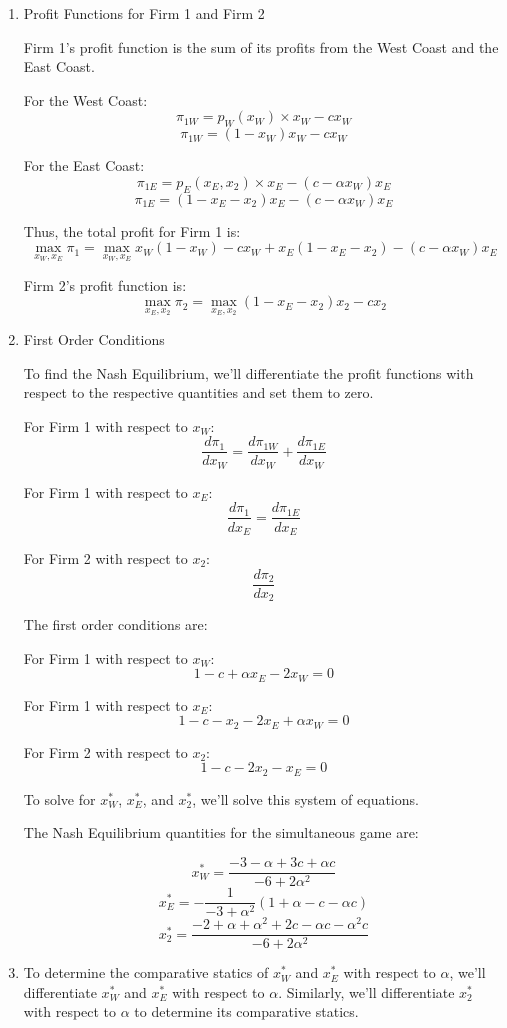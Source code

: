 \documentclass[UTF8,titlepage]{article}
\numberwithin{figure}{section}
\begin{document}
\begin{enumerate}
\item Profit Functions for Firm 1 and Firm 2

Firm 1's profit function is the sum of its profits from the West Coast and the East Coast. 

For the West Coast:
\[ \pi_{1W} = p_W(x_W) \times x_W - c x_W \]
\[ \pi_{1W} = (1-x_W) x_W - c x_W \]

For the East Coast:
\[ \pi_{1E} = p_E(x_E, x_2) \times x_E - (c-\alpha x_W) x_E \]
\[ \pi_{1E} = (1-x_E-x_2) x_E - (c-\alpha x_W) x_E \]

Thus, the total profit for Firm 1 is:
\[ \max _{x_{W}, x_{E}}\pi_1=\max _{x_{W}, x_{E}} x_{W}\left(1-x_{W}\right)-c x_{W}+x_{E}\left(1-x_{E}-x_{2}\right)-\left(c-\alpha x_{W}\right) x_{E} \]

Firm 2's profit function is:
\[ \max_{x_E,x_2}\pi_2 = \max_{x_E,x_2}(1-x_E-x_2) x_2 - c x_2 \]

\item First Order Conditions

To find the Nash Equilibrium, we'll differentiate the profit functions with respect to the respective quantities and set them to zero.

For Firm 1 with respect to \(x_W\):
\[ \frac{d\pi_1}{dx_W} = \frac{d\pi_{1W}}{dx_W} + \frac{d\pi_{1E}}{dx_W} \]

For Firm 1 with respect to \(x_E\):
\[ \frac{d\pi_1}{dx_E} = \frac{d\pi_{1E}}{dx_E} \]

For Firm 2 with respect to \(x_2\):
\[ \frac{d\pi_2}{dx_2} \]

The first order conditions are:

For Firm 1 with respect to \(x_W\):
\[ 1 - c + \alpha x_E - 2 x_W = 0 \]

For Firm 1 with respect to \(x_E\):
\[ 1 - c - x_2 - 2 x_E + \alpha x_W = 0 \]

For Firm 2 with respect to \(x_2\):
\[ 1 - c - 2 x_2 - x_E = 0 \]

To solve for \(x_W^*\), \(x_E^*\), and \(x_2^*\), we'll solve this system of equations.

The Nash Equilibrium quantities for the simultaneous game are:

\[ x_W^* = \frac{-3 - \alpha + 3c + \alpha c}{-6 + 2\alpha^2} \]
\[ x_E^* =- \frac{1}{-3 + \alpha^2} (1 + \alpha - c - \alpha c) \]
\[ x_2^* = \frac{-2 + \alpha + \alpha^2 + 2c - \alpha c - \alpha^2 c}{-6 + 2\alpha^2} \]

\item To determine the comparative statics of \(x_W^*\) and \(x_E^*\) with respect to \(\alpha\), we'll differentiate \(x_W^*\) and \(x_E^*\) with respect to \(\alpha\). Similarly, we'll differentiate \(x_2^*\) with respect to \(\alpha\) to determine its comparative statics.


\end{enumerate}
\end{document}
